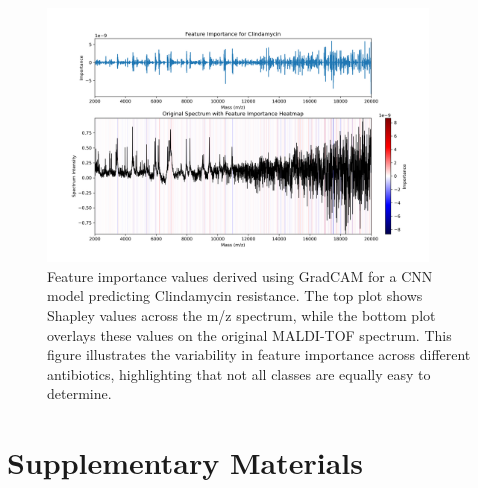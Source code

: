 \documentclass[english,11pt,a4paper,titlepage]{article}
\begin{document}
\begin{figure}[h]
	\centering
	\includegraphics[width=0.9\textwidth]{img/Clindamycin_gradcam.png}
	\caption{Feature importance values derived using GradCAM for a CNN model predicting Clindamycin resistance. The top plot shows Shapley values across the m/z spectrum, while the bottom plot overlays these values on the original MALDI-TOF spectrum. This figure illustrates the variability in feature importance across different antibiotics, highlighting that not all classes are equally easy to determine.}
	\label{fig:clindamycin_gradcam}
\end{figure}

\newpage
\printbibliography

\clearpage
\renewcommand{\thefigure}{S\arabic{figure}}
\renewcommand{\figurename}{}
\setcounter{figure}{0}

\section*{Supplementary Materials}
\end{document}
